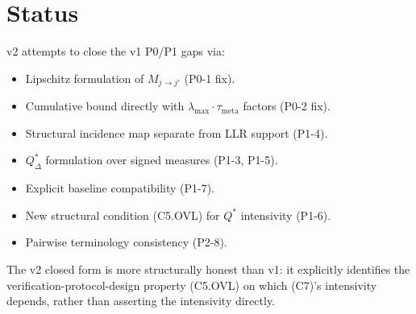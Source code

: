 \documentclass{article}
\newcommand{\lammax}{\lambda_{\max}}
\newcommand{\taumeta}{\tau_{\mathrm{meta}}}
\begin{document}
\section{Status}

v2 attempts to close the v1 P0/P1 gaps via:
\begin{itemize}
\item Lipschitz formulation of $M_{j \to j'}$ (P0-1 fix).
\item Cumulative bound directly with $\lammax \cdot \taumeta$
  factors (P0-2 fix).
\item Structural incidence map separate from LLR support (P1-4).
\item $Q_\Delta^*$ formulation over signed measures (P1-3, P1-5).
\item Explicit baseline compatibility (P1-7).
\item New structural condition (C5.OVL) for $Q^*$ intensivity
  (P1-6).
\item Pairwise terminology consistency (P2-8).
\end{itemize}

The v2 closed form is more structurally honest than v1: it
explicitly identifies the verification-protocol-design property
(C5.OVL) on which (C7)'s intensivity depends, rather than
asserting the intensivity directly.
\end{document}
